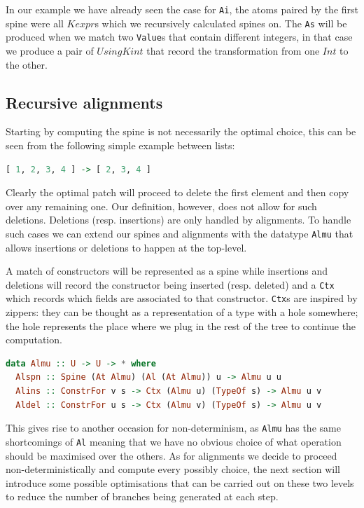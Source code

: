 \documentclass[11pt]{article}
\begin{document}
In our example we have already seen the case for \texttt{Ai}, the atoms paired 
by the first spine were all $Kexpr$s which we recursively calculated spines on. 
The \texttt{As} will be produced when we match two \texttt{Value}s that contain 
different integers, in that case we produce a pair of $Using Kint$ that record 
the transformation from one $Int$ to the other.

\subsection{Recursive alignments}\label{recursive alignments}

Starting by computing the spine is not necessarily the optimal choice, this can 
be seen from the following simple example between lists:

\begin{lstlisting}[language=haskell]
  [ 1, 2, 3, 4 ] -> [ 2, 3, 4 ]
\end{lstlisting}
Clearly the optimal patch will proceed to delete the first element and then 
copy over any remaining one. Our definition, however, does not allow for such 
deletions. Deletions (resp. insertions) are only handled by alignments. To 
handle such cases we can extend our spines and alignments with the datatype 
\texttt{Almu} that allows insertions or deletions to happen at the top-level.

A match of constructors will be represented as a spine while insertions and 
deletions will record the constructor being inserted (resp. deleted) and a 
\texttt{Ctx} which records which fields are associated to that constructor.
\texttt{Ctx}s are inspired by zippers: they can be thought as a representation 
of a  type with a hole somewhere; the hole represents the place where we 
plug in the rest of the tree to continue the computation.
\begin{lstlisting}[language=haskell]
data Almu :: U -> U -> * where
  Alspn :: Spine (At Almu) (Al (At Almu)) u -> Almu u u
  Alins :: ConstrFor v s -> Ctx (Almu u) (TypeOf s) -> Almu u v
  Aldel :: ConstrFor u s -> Ctx (Almu v) (TypeOf s) -> Almu u v
\end{lstlisting}

This gives rise to another occasion for non-determinism, as \texttt{Almu} has 
the same shortcomings of \texttt{Al} meaning that we have no obvious choice of 
what operation should be maximised over the others. As for alignments we decide to proceed non-deterministically
and compute every possibly choice, the next section will introduce some possible optimisations 
that can be carried out on these two levels to reduce the number of branches 
being generated at each step.
\end{document}
